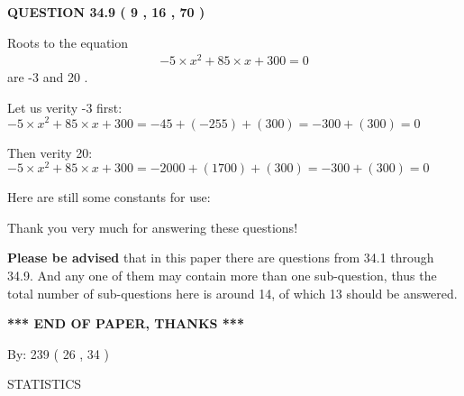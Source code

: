 \documentclass[12pt]{article}
\begin{document}
 
 
  
\vspace{0.2in}
  
{\textbf{\Large{QUESTION
34.9 
 (           9 ,          16 ,          70 )
}}}
  
  


 
 

Roots to the equation
\begin{eqnarray*}
-5 \times x^2  %
+  %
85
                 \times x    %
+  %
300 =0
\end{eqnarray*}
are  %
-3 and  %
20 .
 
Let us verity  %
-3 first:
$  %
-5 \times x^2  %
+  %
85
                 \times x    %
+  %
300
  = %
-45+( %
-255)+( %
300)
  = %
-300+( %
300)
  = %
0
$
 
Then verity  %
20:
$  %
-5 \times x^2  %
+  %
85
                 \times x    %
+  %
300
  = %
-2000+( %
1700)+( %
300)
  = %
-300+( %
300)
  = %
0
$
 
 
 
   
   
 \vspace{0.2in}
Here are still some constants for use:
 
 
 
 
Thank you very much for answering these questions!
 
{\textbf{\large{Please be advised}}} that in this paper there are questions from
34.1 through
34.9.
And any one of them may contain more than one sub-question, thus the total number
of sub-questions here is around 14, of which
13 should be answered.
 
   
   
   
   
\vspace{1.0in} 
{\textbf{\large{ *** END OF PAPER, THANKS *** }}} 
   
   
\hspace{1.0in} By: 
         239 (          26 ,           34 )
   
   
   
\vspace{0.2in}
\vspace{0.2in}
   
   
 \newpage
\setcounter{page}{1} 
   
   
 {\LARGE{STATISTICS}}
   
\vspace{0.2in}
   
\end{document}
